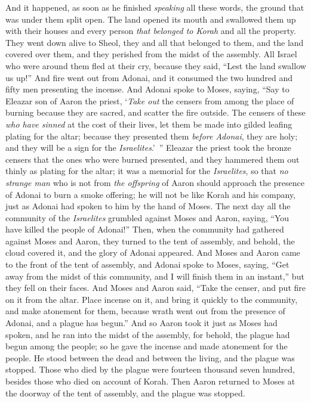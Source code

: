 \begin{biblechapter}
\verse And it happened, as soon as he finished \textit{speaking} all these words, the ground that was under them split open.
\verse The land opened its mouth and swallowed them up with their houses and every person \textit{that belonged to Korah} and all the property.
\verse They went down alive to Sheol, they and all that belonged to them, and the land covered over them, and they perished from the midst of the assembly.
\verse All Israel who were around them fled at their cry, because they said, “Lest the land swallow us up!”
\verse And fire went out from Adonai, and it consumed the two hundred and fifty men presenting the incense.
\verse  And Adonai spoke to Moses, saying,
\verse “Say to Eleazar son of Aaron the priest, ‘\textit{Take out} the censers from among the place of burning because they are sacred, and scatter the fire outside.
\verse The censers of these \textit{who have sinned} at the cost of their lives, let them be made into gilded leafing plating for the altar; because they presented them \textit{before Adonai}, they are holy; and they will be a sign for the \textit{Israelites}.’ ”
\verse Eleazar the priest took the bronze censers that the ones who were burned presented, and they hammered them out thinly as plating for the altar;
\verse it was a memorial for the \textit{Israelites}, so that \textit{no strange man} who is not from \textit{the offspring} of Aaron should approach the presence of Adonai to burn a smoke offering; he will not be like Korah and his company, just as Adonai had spoken to him by the hand of Moses.
 The next day all the community of the \textit{Israelites} grumbled against Moses and Aaron, saying, “You have killed the people of Adonai!”
\verse Then, when the community had gathered against Moses and Aaron, they turned to the tent of assembly, and behold, the cloud covered it, and the glory of Adonai appeared.
\verse And Moses and Aaron came to the front of the tent of assembly,
\verse and Adonai spoke to Moses, saying,
\verse “Get away from the midst of this community, and I will finish them in an instant,” but they fell on their faces.
\verse And Moses and Aaron said, “Take the censer, and put fire on it from the altar. Place incense on it, and bring it quickly to the community, and make atonement for them, because wrath went out from the presence of Adonai, and a plague has begun.”
\verse And so Aaron took it just as Moses had spoken, and he ran into the midst of the assembly, for behold, the plague had begun among the people; so he gave the incense and made atonement for the people.
\verse He stood between the dead and between the living, and the plague was stopped.
\verse Those who died by the plague were fourteen thousand seven hundred, besides those who died on account of Korah.
\verse Then Aaron returned to Moses at the doorway of the tent of assembly, and the plague was stopped.
\end{biblechapter}

